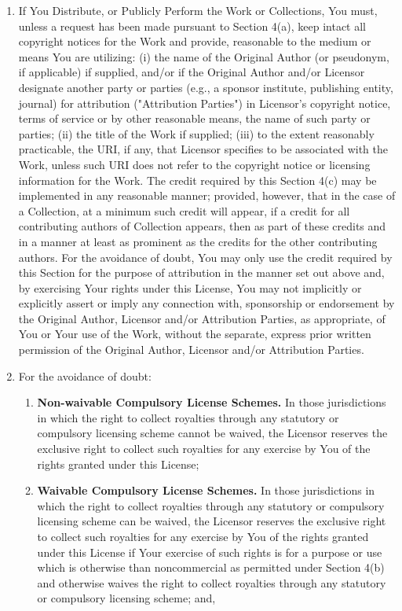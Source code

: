 \begin{enumerate}
\item If You Distribute, or Publicly Perform the Work or Collections, You must, unless a request has been made pursuant to Section 4(a), keep intact all copyright notices for the Work and provide, reasonable to the medium or means You are utilizing: (i) the name of the Original Author (or pseudonym, if applicable) if supplied, and/or if the Original Author and/or Licensor designate another party or parties (e.g., a sponsor institute, publishing entity, journal) for attribution ("Attribution Parties") in Licensor's copyright notice, terms of service or by other reasonable means, the name of such party or parties; (ii) the title of the Work if supplied; (iii) to the extent reasonably practicable, the URI, if any, that Licensor specifies to be associated with the Work, unless such URI does not refer to the copyright notice or licensing information for the Work. The credit required by this Section 4(c) may be implemented in any reasonable manner; provided, however, that in the case of a Collection, at a minimum such credit will appear, if a credit for all contributing authors of Collection appears, then as part of these credits and in a manner at least as prominent as the credits for the other contributing authors. For the avoidance of doubt, You may only use the credit required by this Section for the purpose of attribution in the manner set out above and, by exercising Your rights under this License, You may not implicitly or explicitly assert or imply any connection with, sponsorship or endorsement by the Original Author, Licensor and/or Attribution Parties, as appropriate, of You or Your use of the Work, without the separate, express prior written permission of the Original Author, Licensor and/or Attribution Parties.
\item For the avoidance of doubt:
\begin{enumerate}
  \item \textbf{Non-waivable Compulsory License Schemes.} In those jurisdictions in which the right to collect royalties through any statutory or compulsory licensing scheme cannot be waived, the Licensor reserves the exclusive right to collect such royalties for any exercise by You of the rights granted under this License;
  \item \textbf{Waivable Compulsory License Schemes.} In those jurisdictions in which the right to collect royalties through any statutory or compulsory licensing scheme can be waived, the Licensor reserves the exclusive right to collect such royalties for any exercise by You of the rights granted under this License if Your exercise of such rights is for a purpose or use which is otherwise than noncommercial as permitted under Section 4(b) and otherwise waives the right to collect royalties through any statutory or compulsory licensing scheme; and,

\end{enumerate}
\end{enumerate}
